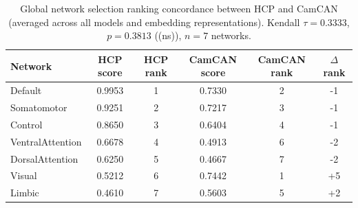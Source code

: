 \begin{table}[ht]
\caption{Global network selection ranking concordance between HCP and CamCAN (averaged across all models and embedding representations). Kendall $\tau = 0.3333$, $p = 0.3813$ ((ns)), $n = 7$ networks.}
\label{tab:global_kendall}
\begin{tabular}{lccccc}
\toprule
Network & HCP score & HCP rank & CamCAN score & CamCAN rank & $\Delta$ rank \\
\midrule
Default & 0.9953 & 1 & 0.7330 & 2 & -1 \\
Somatomotor & 0.9251 & 2 & 0.7217 & 3 & -1 \\
Control & 0.8650 & 3 & 0.6404 & 4 & -1 \\
VentralAttention & 0.6678 & 4 & 0.4913 & 6 & -2 \\
DorsalAttention & 0.6250 & 5 & 0.4667 & 7 & -2 \\
Visual & 0.5212 & 6 & 0.7442 & 1 & +5 \\
Limbic & 0.4610 & 7 & 0.5603 & 5 & +2 \\
\bottomrule
\end{tabular}
\end{table}
